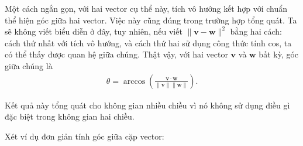 \documentclass[letterpaper,11pt,english]{sphinxmanual}
\begin{document}
Một cách ngắn gọn, với hai vector cụ thể này, tích vô hướng kết hợp với
chuẩn thể hiện góc giữa hai vector. Việc này cũng đúng trong trường hợp
tổng quát. Ta sẽ không viết biểu diễn ở đây, tuy nhiên, nếu viết
\(\|\mathbf{v} - \mathbf{w}\|^2\) bằng hai cách: cách thứ nhất với
tích vô hướng, và cách thứ hai sử dụng công thức tính cos, ta có thể
thấy được quan hệ giữa chúng. Thật vậy, với hai vector
\(\mathbf{v}\) và \(\mathbf{w}\) bất kỳ, góc giữa chúng là
\begin{equation}\label{equation:chapter_appendix_math/geometry-linear-algebric-ops_vn:eq_angle_forumla}
\begin{split}\theta = \arccos\left(\frac{\mathbf{v}\cdot\mathbf{w}}{\|\mathbf{v}\|\|\mathbf{w}\|}\right).\end{split}
\end{equation}


Kết quả này tổng quát cho không gian nhiều chiều vì nó không sử dụng
điều gì đặc biệt trong không gian hai chiều.



Xét ví dụ đơn giản tính góc giữa cặp vector:

\begin{sphinxVerbatim}[commandchars=\\\{\}]
 
 
   
     

  
         

\PYG{p}{[}  \PYG{p}{]} \PYG{p}{[}  \PYG{p}{]}
\end{sphinxVerbatim}
\end{document}
